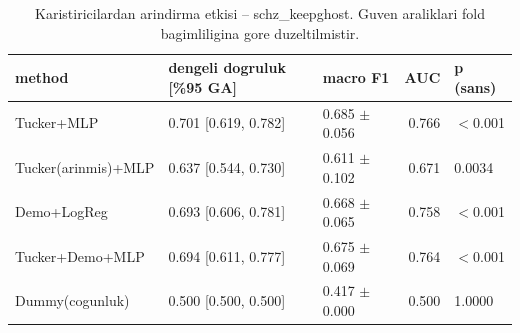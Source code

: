 \begin{table}[htbp]
  \centering
  \caption{Karistiricilardan arindirma etkisi -- schz\_keepghost. Guven araliklari fold bagimliligina gore duzeltilmistir.}
  \label{tab:deconf_schz_keepghost}
  \small
  \begin{tabular}{lllrl}
    \toprule
    method & dengeli dogruluk [\%95 GA] & macro F1 & AUC & p (sans) \\
    \midrule
    Tucker+MLP & 0.701 [0.619, 0.782] & 0.685 $\pm$ 0.056 & 0.766 & $<$0.001 \\
    Tucker(arinmis)+MLP & 0.637 [0.544, 0.730] & 0.611 $\pm$ 0.102 & 0.671 & 0.0034 \\
    Demo+LogReg & 0.693 [0.606, 0.781] & 0.668 $\pm$ 0.065 & 0.758 & $<$0.001 \\
    Tucker+Demo+MLP & 0.694 [0.611, 0.777] & 0.675 $\pm$ 0.069 & 0.764 & $<$0.001 \\
    Dummy(cogunluk) & 0.500 [0.500, 0.500] & 0.417 $\pm$ 0.000 & 0.500 & 1.0000 \\
    \bottomrule
  \end{tabular}
\end{table}
